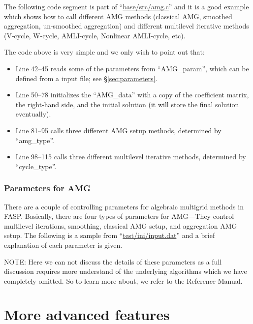 \documentclass[11pt]{memoir}
\begin{document}
The following code segment is part of ``\url{base/src/amg.c}'' and it is a good example which shows how to call different AMG methods (classical AMG, smoothed aggregation, un-smoothed aggregation) and different multilevel iterative methods (V-cycle, W-cycle, AMLI-cycle, Nonlinear AMLI-cycle, etc).
%

%
The code above is very simple and we only wish to point out that:
%
\begin{itemize}
\item Line 42--45 reads some of the parameters from ``AMG\_param'', which can be defined from a input file; see \S\ref{sec:parameters}.
\item Line 50--78 initializes the ``AMG\_data'' with a copy of the coefficient matrix, the right-hand side, and the initial solution (it will store the final solution eventually).
\item Line 81--95 calls three different AMG setup methods, determined by ``amg\_type''.
\item Line 98--115 calls three different multilevel iterative methods, determined by ``cycle\_type''.
\end{itemize}

\subsection{Parameters for AMG}

There are a couple of controlling parameters for algebraic multigrid methods in FASP. Basically, there are four types of parameters for AMG---They control multilevel iterations, smoothing, classical AMG setup, and aggregation AMG setup. The following is a sample from ``\url{test/ini/input.dat}'' and a brief explanation of each parameter is given.
%

%

\begin{snugshade}\noindent
NOTE: Here we can not discuss the details of these parameters as a full discussion requires more understand of the underlying algorithms which we have completely omitted. So to learn more about, we refer to the Reference Manual.
\end{snugshade}

\chapter{More  advanced features}\label{ch:advanced}
\end{document}
